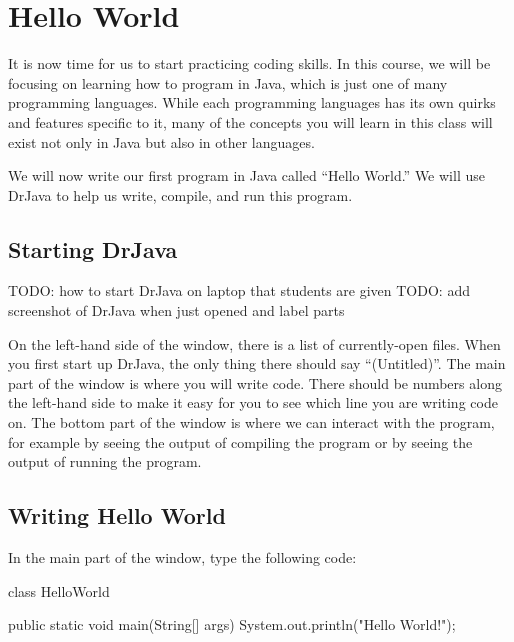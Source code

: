 \chapter{Hello World}

It is now time for us to start practicing coding skills.
In this course, we will be focusing on learning how to program
in Java, which is just one of many programming languages.
While each programming languages has its own quirks and features
specific to it, many of the concepts you will learn in this
class will exist not only in Java but also in other languages.

We will now write our first program in Java called ``Hello World.''
We will use DrJava to help us write, compile, and run this program.

\section{Starting DrJava}
TODO: how to start DrJava on laptop that students are given
TODO: add screenshot of DrJava when just opened and label parts

On the left-hand side of the window, there is a list of currently-open files. When you first start up DrJava, the only thing there should say ``(Untitled)''.
The main part of the window is where you will write code. There should be numbers along the left-hand side to make it easy for you to see which line you are writing code on. The bottom part of the window is where we can interact with the program, for example by seeing the output of compiling the program or by seeing the output of running the program.

\section{Writing Hello World}

In the main part of the window, type the following code:
\begin{code}
class HelloWorld {
    
    public static void main(String[] args) {
        System.out.println("Hello World!");
    }
    
}
\end{code}

